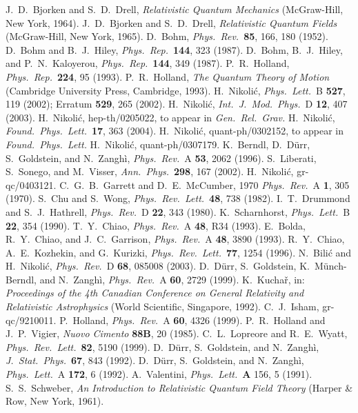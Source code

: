 \documentclass[12pt]{article}
\begin{document}
\begin{thebibliography}{99}

J.~D.~Bjorken and S.~D.~Drell, {\it Relativistic Quantum Mechanics}
(McGraw-Hill, New York, 1964).
J.~D.~Bjorken and S.~D.~Drell, {\it Relativistic Quantum Fields}
(McGraw-Hill, New York, 1965).
D.~Bohm, {\it Phys.~Rev.}~{\bf 85}, 166, 180 (1952).
D.~Bohm and B.~J.~Hiley, 
{\it Phys.~Rep.}~{\bf 144}, 323 (1987).
D.~Bohm, B.~J.~Hiley, and P.~N.~Kaloyerou, 
{\it Phys.~Rep.}~{\bf 144}, 349 (1987).
P.~R.~Holland, {\it Phys.~Rep.}~{\bf 224}, 95 (1993).
P.~R.~Holland, {\it The Quantum Theory of Motion}
(Cambridge University Press, Cambridge, 1993).
H.~Nikoli\'c, {\it Phys.~Lett.}~B {\bf 527}, 119 (2002);
Erratum {\bf 529}, 265 (2002).
H.~Nikoli\'c, {\it Int.~J.~Mod.~Phys.}~D {\bf 12}, 407 (2003).
H.~Nikoli\'c, hep-th/0205022, to appear in 
{\it Gen.~Rel.~Grav.}
H.~Nikoli\'c, {\it Found.~Phys.~Lett.}~{\bf 17}, 363 (2004).
H.~Nikoli\'c, quant-ph/0302152, 
to appear in {\it Found.~Phys.~Lett.}
H.~Nikoli\'c, quant-ph/0307179.
K.~Berndl, D.~D\"urr, S.~Goldstein, and N.~Zangh\`i, 
{\it Phys.~Rev.}~A {\bf 53}, 2062 (1996).
S.~Liberati, S.~Sonego, and M.~Visser, {\it Ann.~Phys.}~{\bf 298}, 
167 (2002).
H.~Nikoli\'c, gr-qc/0403121.
C.~G.~B.~Garrett and D.~E.~McCumber, 1970 {\it Phys.~Rev.}~A {\bf 1}, 
305 (1970).
S.~Chu and S.~Wong, {\it Phys.~Rev.~Lett.}~{\bf 48}, 738 (1982).
I.~T.~Drummond and S.~J.~Hathrell, {\it Phys.~Rev.}~D {\bf 22}, 
343 (1980).
K.~Scharnhorst, {\it Phys.~Lett.}~B {\bf 22}, 354 (1990).
T.~Y.~Chiao, {\it Phys.~Rev.}~A {\bf 48}, R34 (1993).
E.~Bolda, R.~Y.~Chiao, and J.~C.~Garrison, {\it Phys.~Rev.}~A {\bf 48}, 
3890 (1993).
R.~Y.~Chiao, A.~E.~Kozhekin, and G.~Kurizki,  
{\it Phys.~Rev.~Lett.}~{\bf 77}, 1254 (1996).
N.~Bili\'c and H.~Nikoli\'c, {\it Phys.~Rev.}~D {\bf 68}, 085008
(2003).
D.~D\"urr, S.~Goldstein, K.~M\"unch-Berndl, and N.~Zangh\`i, 
{\it Phys.~Rev.}~A {\bf 60}, 2729 (1999).
K.~Kucha\v r, in: {\it Proceedings of the 4th Canadian Conference 
on General Relativity and Relativistic Astrophysics} 
(World Scientific, Singapore, 1992).
C.~J.~Isham, gr-qc/9210011.
P.~Holland, {\it Phys.~Rev.}~A {\bf 60}, 4326 (1999).
P.~R.~Holland and J.~P.~Vigier, {\it Nuovo Cimento} {\bf 88B}, 
20 (1985).
C.~L.~Lopreore and R.~E.~Wyatt, {\it Phys.~Rev.~Lett.}~{\bf 82}, 
5190 (1999).
D.~D\"urr, S.~Goldstein, and N.~Zangh\`i,
{\it J.~Stat.~Phys.}~{\bf 67}, 843 (1992).
D.~D\"urr, S.~Goldstein, and N.~Zangh\`i, 
{\it Phys.~Lett.}~A {\bf 172}, 6 (1992).
A.~Valentini, {\it Phys.~Lett.}~{\bf A} 156, 5 (1991).
S.~S.~Schweber, {\it An Introduction to Relativistic Quantum Field Theory}
(Harper \& Row, New York, 1961).

\end{thebibliography}
\end{document}
